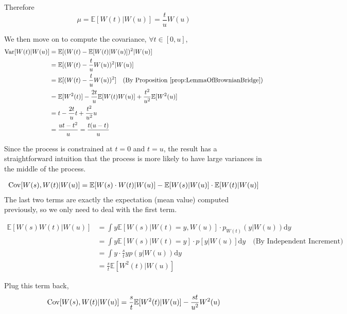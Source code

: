         Therefore
        \[ \mu = \mathbb{E}[W(t)|W(u)] = \frac{t}{u}W(u) \]

        We then move on to compute the covariance, $\forall t \in [0, u]$,
        \begin{align*}
            \mathrm{Var}[W(t) | W(u)] &= \mathbb{E}[(W(t) - \mathbb{E}[W(t)|W(u)])^2 | W(u)]\\
            &= \mathbb{E}[(W(t)- \frac{t}{u}W(u))^2 | W(u)]\\
            &= \mathbb{E}[(W(t) - \frac{t}{u}W(u))^2] \quad \text{(By Proposition \ref{prop:LemmaOfBrownianBridge})}\\
            &= \mathbb{E}[W^2(t)] - \frac{2t}{u}\mathbb{E}[W(t)W(u)] + \frac{t^2}{u^2}\mathbb{E}[W^2(u)]\\
            &= t - \frac{2t}{u}t + \frac{t^2}{u^2}u\\
            &= \frac{ut - t^2}{u} = \frac{t(u-t)}{u}
        \end{align*}
        \begin{remark}
            Since the process is constrained at $t=0$ and $t=u$, the result has a straightforward intuition that the process is more likely to have large variances in the middle of the process.
        \end{remark}

        \begin{align*}
            \mathrm{Cov}[W(s), W(t) | W(u)] &= \mathbb{E}[W(s) \cdot W(t) | W(u)] - \mathbb{E}[W(s) | W(u)] \cdot \mathbb{E}[W(t) | W(u)]\\
        \end{align*}
        The last two terms are exactly the expectation (mean value) computed previously, so we only need to deal with the first term.

        \begin{align*}
            \mathbb{E}[W(s)W(t)|W(u)] &= \int y \mathbb{E}[W(s)|W(t)=y, W(u)]\cdot p_{W(t)}(y|W(u)) \mathrm{d}y\\
            &= \int y \mathbb{E}[W(s) | W(t) = y] \cdot p[y|W(u)]\mathrm{d}y \quad \text{(By Independent Increment)}\\
            &= \int y \cdot \frac{s}{t}y p(y|W(u))\mathrm{d}y\\
            &= \frac{s}{t}\mathbb{E}[W^2(t)|W(u)]
        \end{align*}
        
        Plug this term back,
        \[
            \mathrm{Cov}[W(s), W(t) | W(u)] = \frac{s}{t}\mathbb{E}[W^2(t)|W(u)] - \frac{st}{u^2}W^2(u)
        \]

